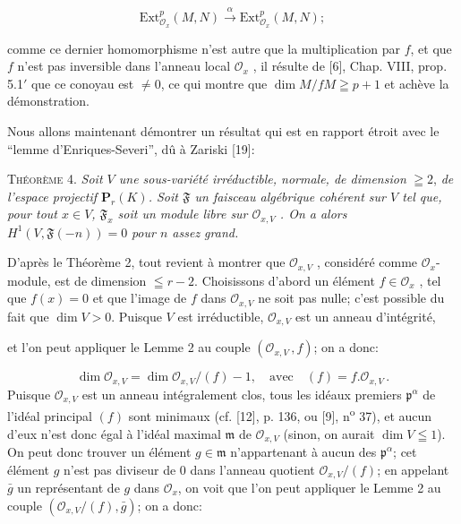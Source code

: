 \begin{equation*}
\mathrm{Ext}_{\mathcal{O}_x}^p(M, N) \overset{\alpha}{\longrightarrow} \mathrm{Ext}_{\mathcal{O}_x}^p(M, N);
\end{equation*}

comme ce dernier homomorphisme n'est autre que la multiplication par $f$, et que $f$ n'est pas inversible dans l'anneau local $\mathcal{O}_x$ , il résulte de [6], Chap. VIII, prop. 5.1$'$ que ce conoyau est $\neq 0$, ce qui montre que $\dim M/fM \geqq p + 1$ et achève la démonstration.

Nous allons maintenant démontrer un résultat qui est en rapport étroit avec le ``lemme d'Enriques-Severi'', dû à Zariski [19]:

\textsc{Théorème} 4. \textit{Soit $V$ une sous-variété irréductible, normale, de dimension} $\geqq 2$, \textit{de l'espace projectif $\mathbf{P}_r(K)$. Soit $\mathfrak{F}$ un faisceau algébrique cohérent sur $V$ tel que, pour tout $x \in V$, $\mathfrak{F}_x$ soit un module libre sur $\mathcal{O}_{x,V}$ . On a alors} $H^1(V, \mathfrak{F}(-n)) = 0$ \textit{pour $n$ assez grand.}

D'après le Théorème 2, tout revient à montrer que $\mathcal{O}_{x,V}$ , considéré comme $\mathcal{O}_x$-module, est de dimension $\leqq r - 2$. Choisissons d'abord un élément $f \in \mathcal{O}_x$ , tel que $f(x) = 0$ et que l'image de $f$ dans $\mathcal{O}_{x,V}$ ne soit pas nulle; c'est possible du fait que $\dim V > 0$. Puisque $V$ est irréductible, $\mathcal{O}_{x,V}$ est un anneau d'intégrité,



 et l'on peut appliquer le Lemme 2 au couple $(\mathcal{O}_{x,V}\,, f)$; on a donc:

\begin{equation*}
\dim \mathcal{O}_{x,V} = \dim \mathcal{O}_{x,V}/(f) - 1, \quad \mathrm{avec} \quad (f) = f.\mathcal{O}_{x,V}\,.
\end{equation*}
Puisque $\mathcal{O}_{x,V}$ est un anneau intégralement clos, tous les idéaux premiers $\mathfrak{p}^{\alpha}$ de l'idéal principal $(f)$ sont minimaux (cf. [12], p. 136, ou [9], n\textsuperscript{o} 37), et aucun d'eux n'est donc égal à l'idéal maximal $\mathfrak{m}$ de $\mathcal{O}_{x,V}$ (sinon, on aurait $\dim V \leqq 1$). On peut donc trouver un élément $g \in \mathfrak{m}$ n'appartenant à aucun des $\mathfrak{p}^{\alpha}$; cet élément $g$ n'est pas diviseur de $0$ dans l'anneau quotient $\mathcal{O}_{x,V}/(f)$; en appelant $\bar{g}$ un représentant de $g$ dans $\mathcal{O}_x$, on voit que l'on peut appliquer le Lemme 2 au couple $(\mathcal{O}_{x,V}/(f), \bar{g})$; on a donc:

